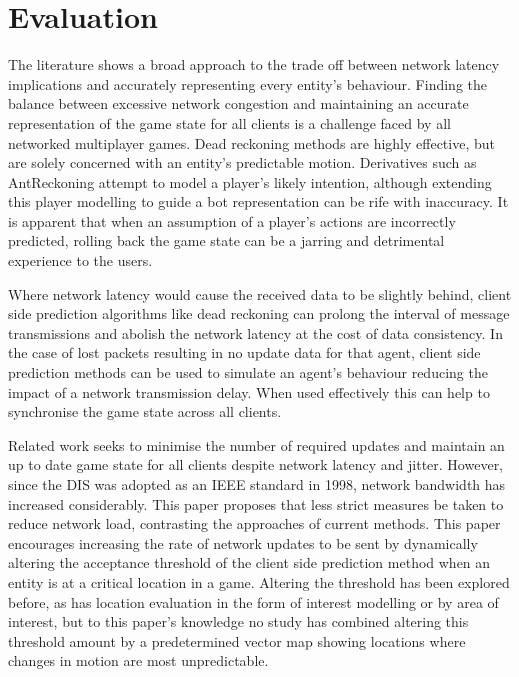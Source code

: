 \documentclass[journal]{IEEEtran}
\begin{document}
\section{Evaluation} \label{evaluation}

The literature shows a broad approach to the trade off between network latency implications and accurately representing every entity's behaviour. Finding the balance between excessive network congestion and maintaining an accurate representation of the game state for all clients is a challenge faced by all networked multiplayer games. Dead reckoning methods are highly effective, but are solely concerned with an entity's predictable motion. Derivatives such as AntReckoning attempt to model a player's likely intention, although extending this player modelling to guide a bot representation can be rife with inaccuracy. It is apparent that when an assumption of a player's actions are incorrectly predicted, rolling back the game state can be a jarring and detrimental experience to the users.

Where network latency would cause the received data to be slightly behind, client side prediction algorithms like dead reckoning can prolong the interval of message transmissions and abolish the network latency at the cost of data consistency. In the case of lost packets resulting in no update data for that agent, client side prediction methods can be used to simulate an agent's behaviour reducing the impact of a network transmission delay. When used effectively this can help to synchronise the game state across all clients.

Related work seeks to minimise the number of required updates and maintain an up to date game state for all clients despite network latency and jitter. However, since the DIS was adopted as an IEEE standard in 1998, network bandwidth has increased considerably. This paper proposes that less strict measures be taken to reduce network load, contrasting the approaches of current methods. This paper encourages increasing the rate of network updates to be sent by dynamically altering the acceptance threshold of the client side prediction method when an entity is at a critical location in a game. Altering the threshold has been explored before, as has location evaluation in the form of interest modelling or by area of interest, but to this paper's knowledge no study has combined altering this threshold amount by a predetermined vector map showing locations where changes in motion are most unpredictable.
\end{document}

